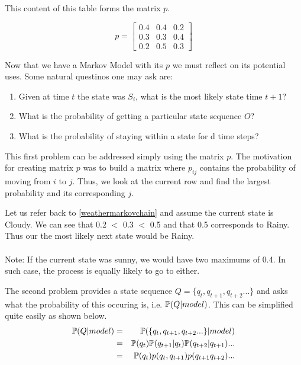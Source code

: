 This content of this table forms the matrix $p$. 

\begin{equation}
p = 
\begin{bmatrix}
	0.4 & 0.4 & 0.2 \\
	0.3 & 0.3 & 0.4 \\
	0.2 & 0.5 & 0.3 
	\end{bmatrix}
\end{equation}

Now that we have a Markov Model with its $p$ we must reflect on its potential uses. Some natural questinos one may ask are:
\begin{enumerate}
	\item Given at time $t$ the state was $S_i$, what is the most likely state time $t+1$?
	\item What is the probability of getting a particular state sequence $O$?
	\item What is the probability of staying within a state for d time steps?
\end{enumerate}

This first problem can be addressed simply using the matrix $p$. The motivation for creating matrix $p$ was to build a matrix where $p_{ij}$ contains the probability of moving from $i$ to $j$. Thus, we look at the current row and find the largest probability and its corresponding $j$.
\begin{example}
	Let us refer back to \ref{weathermarkovchain} and assume the current state is Cloudy. We can see that 0.2 $<$ 0.3 $<$ 0.5 and that 0.5 corresponds to Rainy. Thus our the most likely next state would be Rainy. 
	\\
	\\
	Note: If the current state was sunny, we would have two maximums of 0.4. In such case, the process is equally likely to go to either. 
\end{example}

The second problem provides a state sequence $Q = \{q_t,q_{t+1},q_{t+2}...\}$ and asks what the probability of this occuring is, i.e. $\mathbb{P} (Q | model)$. This can be simplified quite easily as shown below.
\begin{eqnarray}
	\label{markovchainstateseqprob}
	\mathbb{P} (Q | model) & = & \mathbb{P} (\{q_t,q_{t+1},q_{t+2}...\} | model) \\
					  & = & \mathbb{P} (q_{t}) \mathbb{P} (q_{t+1}| q_{t}) \mathbb{P} (q_{t+2}| q_{t+1})... \\
					  & = & \mathbb{P} (q_t) p(q_t,q_{t+1}) p(q_{t+1}q_{t+2}) ...
\end{eqnarray}

